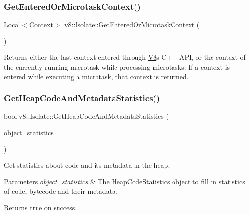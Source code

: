 \subsubsection{\texorpdfstring{Get\+Entered\+Or\+Microtask\+Context()}{GetEnteredOrMicrotaskContext()}}
{\footnotesize\ttfamily \mbox{\hyperlink{classv8_1_1Local}{Local}}$<$\mbox{\hyperlink{classv8_1_1Context}{Context}}$>$ v8\+::\+Isolate\+::\+Get\+Entered\+Or\+Microtask\+Context (\begin{DoxyParamCaption}{ }\end{DoxyParamCaption})}

Returns either the last context entered through \mbox{\hyperlink{classv8_1_1V8}{V8}}\textquotesingle{}s C++ A\+PI, or the context of the currently running microtask while processing microtasks. If a context is entered while executing a microtask, that context is returned. \mbox{\label{classv8_1_1Isolate_a11c60483e2e5ddec55003e1ca152d487}} 
\subsubsection{\texorpdfstring{Get\+Heap\+Code\+And\+Metadata\+Statistics()}{GetHeapCodeAndMetadataStatistics()}}
{\footnotesize\ttfamily bool v8\+::\+Isolate\+::\+Get\+Heap\+Code\+And\+Metadata\+Statistics (\begin{DoxyParamCaption}\item[{\mbox{\hyperlink{classv8_1_1HeapCodeStatistics}{Heap\+Code\+Statistics}} $\ast$}]{object\+\_\+statistics }\end{DoxyParamCaption})}

Get statistics about code and its metadata in the heap.


\begin{DoxyParams}{Parameters}
{\em object\+\_\+statistics} & The \mbox{\hyperlink{classv8_1_1HeapCodeStatistics}{Heap\+Code\+Statistics}} object to fill in statistics of code, bytecode and their metadata. \\
\hline
\end{DoxyParams}
\begin{DoxyReturn}{Returns}
true on success. 
\end{DoxyReturn}
\mbox{\label{classv8_1_1Isolate_a677681d4c3abfc1bc2e8b50c23623e24}} 
